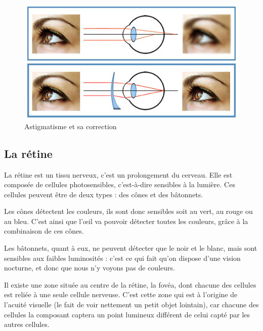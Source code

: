 \documentclass[a4paper, 12pt, onecolumn, openany]{report}
\begin{document}
	\begin{figure}[h]
	\begin{center}	
	\includegraphics[scale=0.5]{astigmatisme3.jpg}
	\end{center}
	\caption{Astigmatisme et sa correction}
	\label{Astigmatisme et sa correction}
	\end{figure}
	
	\newpage
	
	\subsection{La rétine}
	
	La rétine est un tissu nerveux, c’est un prolongement du cerveau. Elle est composée de cellules photosensibles, c'est-à-dire sensibles à la lumière. Ces cellules peuvent être de deux types : des cônes et des bâtonnets. 
	
	Les cônes détectent les couleurs, ils sont donc sensibles soit au vert, au rouge ou au bleu. C’est ainsi que l’œil va pouvoir détecter toutes les couleurs, grâce à la combinaison de ces cônes. 
	
	Les bâtonnets, quant à eux, ne peuvent détecter que le noir et le blanc, mais sont sensibles aux faibles luminosités : c’est ce qui fait qu’on dispose d’une vision nocturne, et donc que nous n’y voyons pas de couleurs.
	
	Il existe une zone située au centre de la rétine, la fovéa, dont chacune des cellules est reliée à une seule cellule nerveuse. C’est cette zone qui est à l’origine de l’acuité visuelle (le fait de voir nettement un petit objet lointain), car chacune des cellules la composant captera un point lumineux différent de celui capté par les autres cellules.
	
\end{document}
